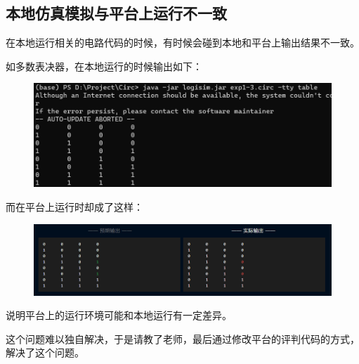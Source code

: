 \documentclass[UTF8]{ctexart}
\begin{document}
\subsection{本地仿真模拟与平台上运行不一致}

在本地运行相关的电路代码的时候，有时候会碰到本地和平台上输出结果不一致。

如多数表决器，在本地运行的时候输出如下：

\begin{figure}[H]
    \centering
    \includegraphics[width = \textwidth]{images/native0.png}
\end{figure}

而在平台上运行时却成了这样：

\begin{figure}[H]
    \centering
    \includegraphics[width = \textwidth]{images/test0.png}
\end{figure}

说明平台上的运行环境可能和本地运行有一定差异。

这个问题难以独自解决，于是请教了老师，最后通过修改平台的评判代码的方式，解决了这个问题。


\end{document}
